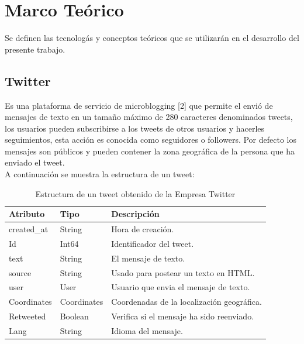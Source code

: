 %
\chapter{Marco Te\'orico}

Se definen las tecnolog\'as y conceptos te\'oricos que se utilizar\'an en el desarrollo del presente trabajo.


\section{Twitter}
\setcounter{equation}{0}

Es una plataforma de servicio de microblogging [2] que permite el envi\'o de mensajes de texto en un tamaño m\'aximo de 280 caracteres denominados tweets, los usuarios pueden subscribirse a los tweets de otros usuarios y hacerles seguimientos, esta acci\'on es conocida como seguidores o followers. Por defecto los mensajes son p\'ublicos y pueden contener la zona geogr\'afica de la persona que ha enviado el tweet.\\

A continuaci\'on se muestra la estructura de un tweet:

\begin{table}[H]

\begin{center}
\begin{tabular}{ |p{2cm}|p{2cm}|p{6cm}| }
\hline
\rowcolor{gray!40}  \textbf{Atributo}         & \textbf{Tipo}      & \textbf{Descripci\'on}   \\  \hline
 created\_at   & String  & Hora de creaci\'on.        \\   \hline
 Id                  & Int64   & Identificador del tweet.  \\   \hline
 text                & String  & El mensaje de texto.  \\   \hline
 source           & String  & Usado para postear un texto en HTML.  \\   \hline
 user               & User    & Usuario que envia el mensaje de texto.  \\   \hline
 Coordinates   & Coordinates   & Coordenadas de la localizaci\'on geogr\'afica.  \\   \hline
 Retweeted     & Boolean   & Verifica si el mensaje ha sido reenviado.  \\   \hline
 Lang               & String   & Idioma del mensaje.  \\   \hline
\end{tabular}
\caption{Estructura de un tweet obtenido de la Empresa Twitter}

\end{center}
\end{table}
		
